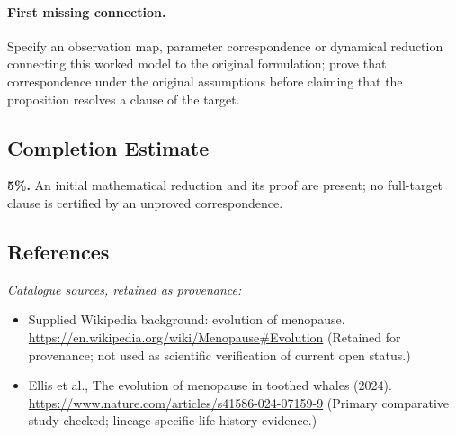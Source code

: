 \documentclass[11pt]{article}
\begin{document}
\paragraph{First missing connection.} Specify an observation map, parameter correspondence or dynamical reduction connecting this worked model to the original formulation; prove that correspondence under the original assumptions before claiming that the proposition resolves a clause of the target.
\subsection{Completion Estimate}
\textbf{5\%.} An initial mathematical reduction and its proof are present; no full-target clause is certified by an unproved correspondence.
\subsection{References}
\noindent\emph{Catalogue sources, retained as provenance:}
\begin{itemize}
\item Supplied Wikipedia background: evolution of menopause. \url{https://en.wikipedia.org/wiki/Menopause#Evolution} (Retained for provenance; not used as scientific verification of current open status.)
\item Ellis et al., The evolution of menopause in toothed whales (2024). \url{https://www.nature.com/articles/s41586-024-07159-9} (Primary comparative study checked; lineage-specific life-history evidence.)
\end{itemize}
\end{document}
